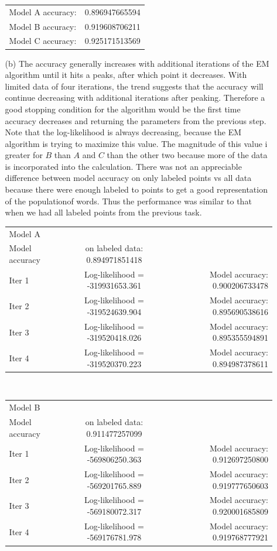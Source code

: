 \documentclass{article}
\begin{document}
\begin{enumerate}
\begin{enumerate}
\begin{tabular}{ l r }
Model A accuracy: & 0.896947665594\\
Model B accuracy: & 0.919608706211\\
Model C accuracy: & 0.925171513569\\
\end{tabular}
		\item[(b)]
		The accuracy generally increases with additional iterations of the EM algorithm until it hits a peaks, after which point it decreases. With limited data of four iterations, the trend suggests that the accuracy will continue decreasing with additional iterations after peaking. Therefore a good stopping condition for the algorithm would be the first time accuracy decreases and returning the parameters from the previous step. Note that the log-likelihood is always decreasing, because the EM algorithm is trying to maximize this value. The magnitude of this value i greater for $B$ than $A$ and $C$ than the other two because more of the data is incorporated into the calculation. There was not an appreciable difference between model accuracy on only labeled points vs all data because there were enough labeled to points to get a good representation of the populationof words. Thus the performance was similar to that when we had all labeled points from the previous task.\\

\begin{tabular}{ l c r }
Model A & &\\
Model accuracy & on labeled data: 0.894971851418&\\
Iter 1 & Log-likelihood = -319931653.361 & Model accuracy: 0.900206733478\\
Iter 2 & Log-likelihood = -319524639.904 & Model accuracy: 0.895690538616\\
Iter 3 & Log-likelihood = -319520418.026 & Model accuracy: 0.895355594891\\
Iter 4 & Log-likelihood = -319520370.223 & Model accuracy: 0.894987378611\\
\end{tabular}\\

\begin{tabular}{ l c r }
Model B & &\\
Model accuracy & on labeled data: 0.911477257099&\\
Iter 1 & Log-likelihood = -569806250.363 & Model accuracy: 0.912697250800\\
Iter 2 & Log-likelihood = -569201765.889 & Model accuracy: 0.919777650603\\
Iter 3 & Log-likelihood = -569180072.317 & Model accuracy: 0.920001685809\\
Iter 4 & Log-likelihood = -569176781.978 & Model accuracy: 0.919768777921\\
\end{tabular}\\


\end{enumerate}
\end{enumerate}
\end{document}

